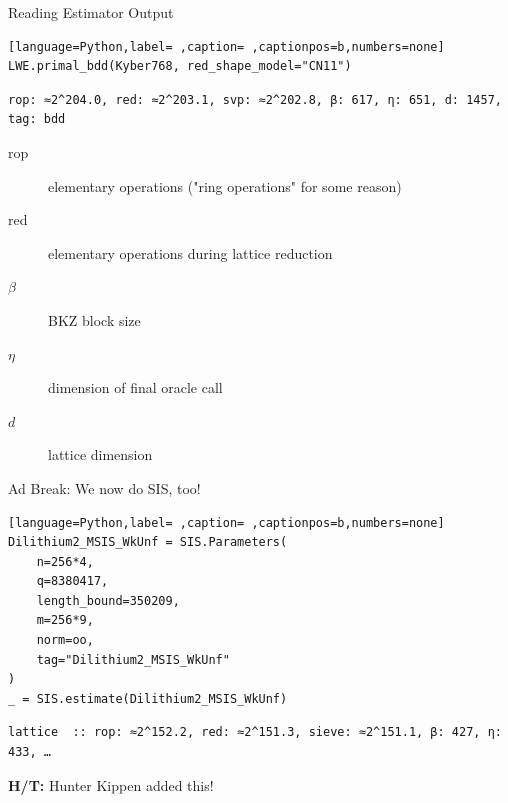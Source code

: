 \documentclass[table,10pt,aspectratio=169]{beamer}
\begin{document}
\begin{frame}[label={sec:orged2043a},fragile]{Reading Estimator Output}
 \begin{lstlisting}[language=Python,label= ,caption= ,captionpos=b,numbers=none]
LWE.primal_bdd(Kyber768, red_shape_model="CN11")
\end{lstlisting}

\begin{verbatim}
rop: ≈2^204.0, red: ≈2^203.1, svp: ≈2^202.8, β: 617, η: 651, d: 1457, tag: bdd
\end{verbatim}


\begin{description}
\item[{rop}] elementary operations ("ring operations" for some reason)
\item[{red}] elementary operations during lattice reduction
\item[{\(\beta\)}] BKZ block size
\item[{\(\eta\)}] dimension of final oracle call
\item[{\(d\)}] lattice dimension
\end{description}
\end{frame}

\begin{frame}[label={sec:orga0a54ee},fragile]{\alert{Ad Break: We now do SIS, too!}}
 \begin{lstlisting}[language=Python,label= ,caption= ,captionpos=b,numbers=none]
Dilithium2_MSIS_WkUnf = SIS.Parameters(
    n=256*4,
    q=8380417,
    length_bound=350209,
    m=256*9,
    norm=oo,
    tag="Dilithium2_MSIS_WkUnf"
)
_ = SIS.estimate(Dilithium2_MSIS_WkUnf)
\end{lstlisting}

\begin{verbatim}
lattice  :: rop: ≈2^152.2, red: ≈2^151.3, sieve: ≈2^151.1, β: 427, η: 433, …
\end{verbatim}


\textbf{H/T:} Hunter Kippen added this!
\end{frame}
\end{document}
